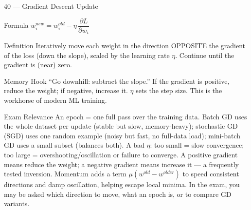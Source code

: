 \documentclass[aspectratio=169,8pt]{beamer}
\begin{document}
	\begin{frame}{40 --- Gradient Descent Update}
		\begin{block}{Formula}
			$w_i^{new} = w_i^{old} - \eta\,\dfrac{\partial L}{\partial w_i}$
		\end{block}
		\begin{block}{Definition}
			Iteratively move each weight in the direction OPPOSITE the gradient of the loss (down the slope), scaled by the learning rate $\eta$. Continue until the gradient is (near) zero.
		\end{block}
		\begin{block}{Memory Hook}
			``Go downhill: subtract the slope.'' If the gradient is positive, reduce the weight; if negative, increase it. $\eta$ sets the step size. This is the workhorse of modern ML training.
		\end{block}
		\begin{block}{Exam Relevance}
			An epoch = one full pass over the training data. Batch GD uses the whole dataset per update (stable but slow, memory-heavy); stochastic GD (SGD) uses one random example (noisy but fast, no full-data load); mini-batch GD uses a small subset (balances both). A bad $\eta$: too small = slow convergence; too large = overshooting/oscillation or failure to converge. A positive gradient means reduce the weight; a negative gradient means increase it --- a frequently tested inversion. Momentum adds a term $\mu(w^{old} - w^{older})$ to speed consistent directions and damp oscillation, helping escape local minima. In the exam, you may be asked which direction to move, what an epoch is, or to compare GD variants.
		\end{block}
	\end{frame}
	
\end{document}
